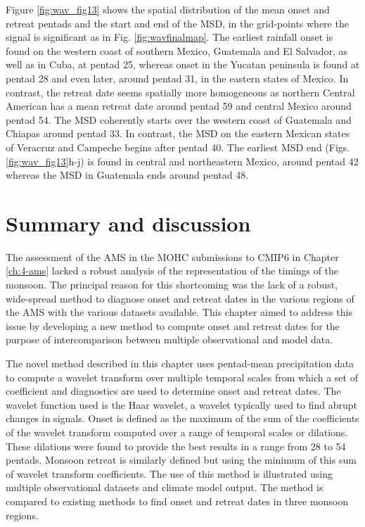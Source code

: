 Figure \ref{fig:wav_fig13} shows the spatial distribution of the mean onset and retreat pentads and the start and end of the MSD, in the grid-points where the signal is significant as in Fig. \ref{fig:wavfinalmap}. The earliest rainfall onset is found on the western coast of southern Mexico, Guatemala and El Salvador, as well as in Cuba, at pentad 25, whereas onset in the Yucatan peninsula is found at pentad 28 and even later, around pentad 31, in the eastern states of Mexico. In contrast, the retreat date seems spatially more homogeneous as northern Central American has a mean retreat date around pentad 59 and central Mexico around pentad 54.
The MSD coherently starts over the western coast of Guatemala and Chiapas around pentad 33. In contrast, the MSD on the eastern Mexican states of Veracruz and Campeche begins after pentad 40. The earliest MSD end (Figs. \ref{fig:wav_fig13}h-j) is found in central and northeastern Mexico, around pentad 42 whereas the MSD in Guatemala ends around pentad 48.



\section{Summary and discussion}

The assessment of the AMS in the MOHC submissions to CMIP6 in Chapter \ref{ch:4-ams} lacked a robust analysis of the representation of the timings of the monsoon. 
The principal reason for this shortcoming was the lack of a robust, wide-spread method to diagnose onset and retreat dates in the various regions of the AMS with the various datasets available. This chapter aimed to address this issue by developing a new method to compute onset and retreat dates for the purpose of intercomparison between multiple observational and model data.

The novel method described in this chapter uses pentad-mean precipitation data to compute a wavelet transform over multiple temporal scales from which a set of coefficient and diagnostics are used to determine onset and retreat dates. The wavelet function used is the Haar wavelet, a wavelet typically used to find abrupt changes in signals.
Onset is defined as the maximum of the sum of the coefficients of the wavelet transform computed over a range of temporal scales or dilations. These dilations were found to provide the best results in a range from 28 to 54 pentads. Monsoon retreat is similarly defined but using the minimum of this sum of wavelet transform coefficients. The use of this method is illustrated using multiple observational datasets and climate model output. The method is compared to existing methods to find onset and retreat dates in three monsoon regions.

